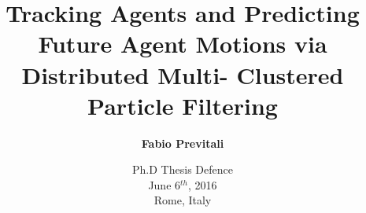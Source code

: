 \documentclass{beamer}
\title[Tracking Agents and Predicting Future Agent Motions via Distributed M-C PF]{\Large Tracking Agents and Predicting Future Agent Motions via Distributed Multi- Clustered Particle Filtering}
\subtitle{}
\author[Fabio Previtali]{\Large\textbf{Fabio Previtali}}
\date[June 6$^{th}$, 2016]{Ph.D Thesis Defence\\June 6$^{th}$, 2016\\Rome, Italy}
\begin{document}
\begin{frame}[plain]
	\titlepage
\end{frame}










\tiny



\appendix


\end{document}
